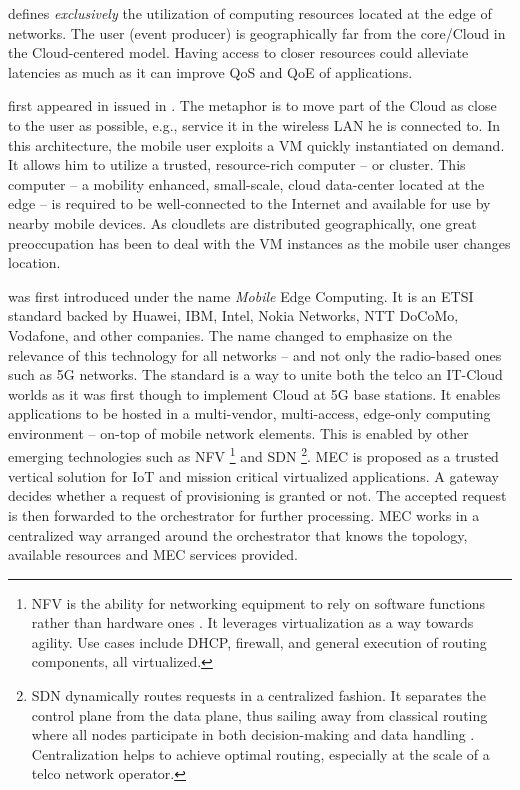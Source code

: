 \begin{description}[leftmargin=10pt]
	\item[Edge Computing] defines \emph{exclusively} the utilization of computing resources located at the edge of networks. The user (event producer) is geographically far from the core/Cloud in the Cloud-centered model. Having access to closer resources could alleviate latencies as much as it can improve \gls{QoS} and \gls{QoE} of applications.
	
	\item[Cloudlets] first appeared in \cite{satyanarayanan_case_2009} issued in . The metaphor is to move part of the Cloud as close to the user as possible, e.g., service it in the wireless LAN he is connected to. In this architecture, the mobile user exploits a \gls{VM} quickly instantiated on demand. It allows him to utilize a trusted, resource-rich computer -- or cluster. This computer -- a mobility enhanced, small-scale, cloud data-center located at the edge -- is required to be well-connected to the Internet and available for use by nearby mobile devices. As cloudlets are distributed geographically, one great preoccupation has been to deal with the \gls{VM} instances as the mobile user changes location.
	
	\item[\acrfull{MEC}] was first introduced under the name \emph{Mobile} Edge Computing. It is an \gls{ETSI} standard backed by Huawei, IBM, Intel, Nokia Networks, NTT DoCoMo, Vodafone, and other companies. The name changed to emphasize on the relevance of this technology for all networks -- and not only the radio-based ones such as 5G networks. The standard is a way to unite both the telco an IT-Cloud worlds \cite{dahmen-lhuissier_etsi_nodate-1} as it was first though to implement Cloud at 5G base stations. It enables applications to be hosted in a multi-vendor, multi-access, edge-only computing environment -- on-top of mobile network elements. This is enabled by other emerging technologies such as \gls{NFV} \footnote{\acrfull{NFV} is the ability for networking equipment to rely on software functions rather than hardware ones \cite{redhat_what_2019}. It leverages virtualization as a way towards agility. Use cases include DHCP, firewall, and general execution of routing components, all virtualized.} and \gls{SDN} \footnote{\acrfull{SDN} dynamically routes requests in a centralized fashion. It separates the control plane from the data plane, thus sailing away from classical routing where all nodes participate in both decision-making and data handling \cite{redhat_what_2019}. Centralization helps to achieve optimal routing, especially at the scale of a telco network operator.}. \gls{MEC} is proposed as a trusted vertical solution for \gls{IoT} and mission critical virtualized applications.
	A gateway decides whether a request of provisioning is granted or not. The accepted request is then forwarded to the orchestrator for further processing. \gls{MEC} works in a centralized way arranged around the orchestrator that knows the topology, available resources and \gls{MEC} services provided.
	

\end{description}
